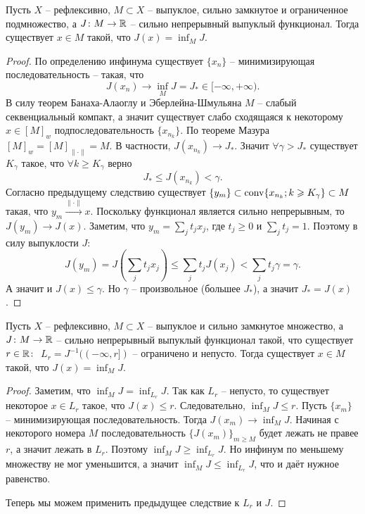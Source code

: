 \begin{corollary}
    Пусть $X$ -- рефлексивно, $M \subset X$ -- выпуклое, сильно замкнутое и ограниченное подмножество,
    а $J\colon M \to \mathbb{R}$ -- сильно непрерывный выпуклый функционал.
    Тогда существует $x \in M$ такой, что $J(x) = \inf_{M} J$.
\end{corollary}
\begin{proof}
    По определению инфинума существует $\{x_n\}$ -- минимизирующая последовательность -- такая, что
    \[
        J(x_n) \rightarrow \inf_{M} J = J_* \in [-\infty, +\infty).
    \]
    В силу теорем Банаха-Алаоглу и Эберлейна-Шмульяна $M$ -- слабый секвенциальный компакт, а значит существует слабо сходящаяся к некоторому $x \in [M]_{w}$ подпоследовательность $\{x_{n_k}\}$.
    По теореме Мазура $[M]_{w} = [M]_{\|\cdot\|} = M$.
    В частности, $J(x_{n_k}) \rightarrow J_*$.
    Значит $\forall \gamma > J_*$ существует $K_\gamma$ такое, что $\forall k \geq K_\gamma$ верно
    \[
        J_{*} \leq J(x_{n_k}) < \gamma.
    \]
    Согласно предыдущему следствию существует $\{y_m\} \subset \operatorname{conv}\{x_{n_k}; k \geqslant K_\gamma\} \subset M$ такая, что $y_m \xrightarrow{\|\cdot\|} x$.
    Поскольку функционал является сильно непрерывным, то $J(y_m) \rightarrow J(x)$.
    Заметим, что $y_m = \sum_{j} t_j x_j$, где $t_j \geq 0$ и $\sum_j t_j = 1$.
    Поэтому в силу выпуклости $J\colon$
    \[
        J(y_m) = J\left(\sum_{j} t_j x_j\right) \leq \sum_{j} t_j J(x_j) < \sum_{j} t_j \gamma = \gamma.
    \]
    А значит и $J(x) \leq \gamma$.
    Но $\gamma$ -- произвольное (большее $J_*$), а значит $J_* = J(x)$.
\end{proof}
\begin{corollary}
    Пусть $X$ -- рефлексивно, $M \subset X$ -- выпуклое и сильно замкнутое множество,
    а $J\colon M \to \mathbb{R}$ -- сильно непрерывный выпуклый функционал такой, что существует $r \in \mathbb{R}\colon$ $L_r = J^{-1}((-\infty, r])$ -- ограничено и непусто.
    Тогда существует $x \in M$ такой, что $J(x) = \inf_{M} J$.
\end{corollary}
\begin{proof}
    Заметим, что $\inf_{M} J = \inf_{L_r}J$.
    Так как $L_r$ -- непусто, то существует некоторое $x \in L_r$ такое, что $J(x) \leq r$.
    Следовательно, $\inf_M J \leq r$.
    Пусть $\{x_m\}$ -- минимизирующая последовательность.
    Тогда $J(x_m) \rightarrow \inf_M J$.
    Начиная с некоторого номера $M$ последовательность $\{J(x_m)\}_{m \geq M}$ будет лежать не правее $r$, а значит лежать в $L_r$.
    Поэтому $\inf_M J \geq \inf_{L_r} J$.
    Но инфинум по меньшему множеству не мог уменьшится, а значит $\inf_M J \leq \inf_{L_r} J$, что и даёт нужное равенство.

    Теперь мы можем применить предыдущее следствие к $L_r$ и $J$.
\end{proof}
